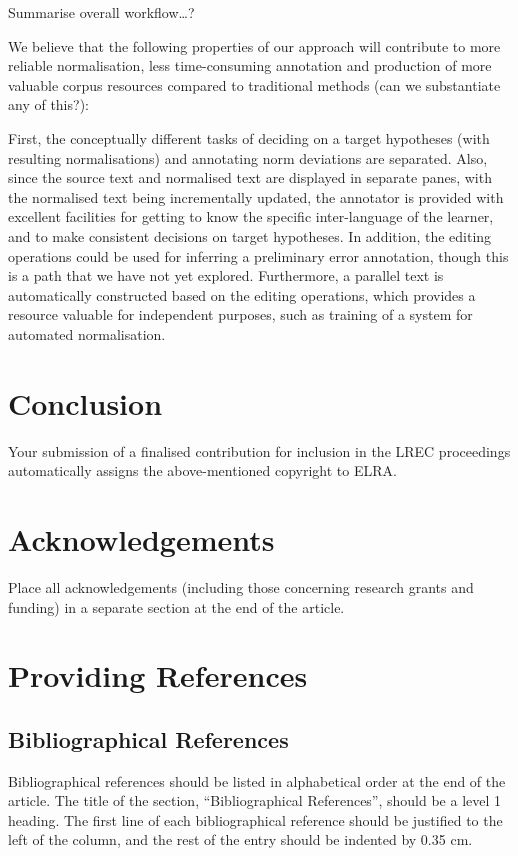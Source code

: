 \documentclass[10pt, a4paper]{article}
\begin{document}
Summarise overall workflow\ldots ?

We believe that the following properties of our approach will contribute to more reliable normalisation, less time-consuming annotation and production of more valuable corpus resources compared to traditional methods (can we substantiate any of this?):

First, the conceptually different tasks of deciding on a target hypotheses (with resulting normalisations) and annotating norm deviations are separated. Also, since the source text and normalised text are displayed in separate panes, with the normalised text being incrementally updated, the annotator is provided with excellent facilities for getting to know the specific inter-language of the learner, and to make consistent decisions on target hypotheses. In addition, the editing operations could be used for inferring a preliminary error annotation, though this is a path that we have not yet explored. Furthermore, a parallel text is automatically constructed based on the editing operations, which provides a resource valuable for independent purposes, such as training of a system for automated normalisation.

\section{Conclusion}

Your submission of a finalised contribution for inclusion in the LREC
proceedings automatically assigns the above-mentioned copyright to ELRA.

\section{Acknowledgements}

Place all acknowledgements (including those concerning research grants and
funding) in a separate section at the end of the article.

\section{Providing References}

\subsection{Bibliographical References}
Bibliographical references should be listed in alphabetical order at the
end of the article. The title of the section, ``Bibliographical References'',
should be a level 1 heading. The first line of each bibliographical reference
should be justified to the left of the column, and the rest of the entry should
be indented by 0.35 cm.
\end{document}
